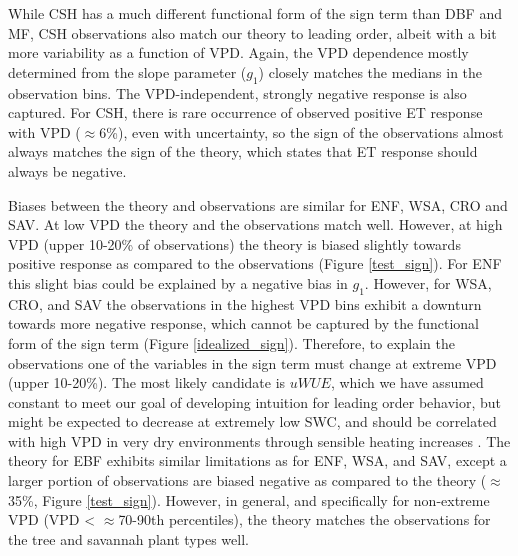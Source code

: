 \documentclass[draft,linenumbers]{agujournal}
\begin{document}
While CSH has a much different functional form of the sign term than
DBF and MF, CSH observations also match our theory to leading order,
albeit with a bit more variability as a function of VPD. Again, the
VPD dependence mostly determined from the slope parameter ($g_1$)
closely matches the medians in the observation bins. The
VPD-independent, strongly negative response is also captured. For CSH,
there is rare occurrence of observed positive ET response with VPD
($\approx 6$\%), even with uncertainty, so the sign of the
observations almost always matches the sign of the theory, which
states that ET response should always be negative.

Biases between the theory and observations are similar for ENF, WSA,
CRO and SAV. At low VPD the theory and the observations match
well. However, at high VPD (upper 10-20\% of observations) the theory
is biased slightly towards positive response as compared to the
observations (Figure \ref{test_sign}). For ENF this slight bias could
be explained by a negative bias in $g_1$. However, for WSA, CRO, and
SAV the observations in the highest VPD bins exhibit a downturn
towards more negative response, which cannot be captured by the
functional form of the sign term (Figure
\ref{idealized_sign}). Therefore, to explain the observations one of
the variables in the sign term must change at extreme VPD (upper
10-20\%). The most likely candidate is $uWUE$, which we have assumed
constant to meet our goal of developing intuition for leading order
behavior, but might be expected to decrease at extremely low SWC, and should be correlated with high VPD in very dry environments
through sensible heating increases \citep{Gentine_2016}. The theory
for EBF exhibits similar limitations as for ENF, WSA, and SAV, except
a larger portion of observations are biased negative as compared to
the theory ($\approx$ 35\%, Figure \ref{test_sign}). However, in
general, and specifically for non-extreme VPD (VPD < $\approx$70-90th
percentiles), the theory matches the observations for the tree and
savannah plant types well.
\end{document}
